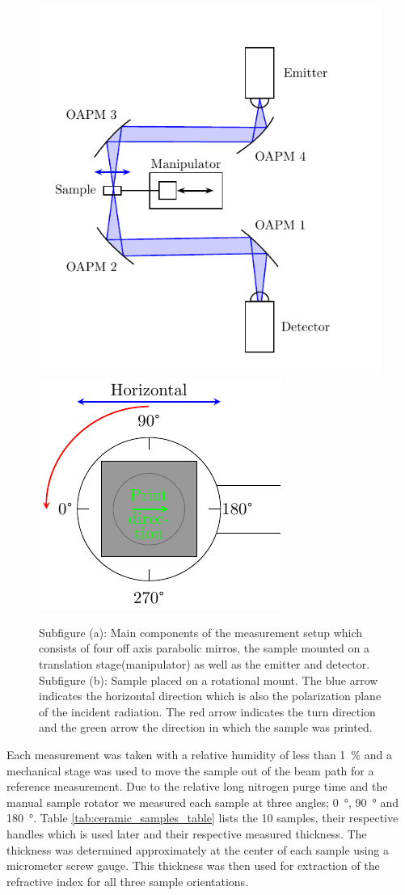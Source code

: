 \begin{figure}[H]
    \centering
    \subcaptionbox{\label{fig:setup_1}}
        {\hspace*{-2em}\includegraphics[width=0.45\linewidth]{images/7_appendix/Setup-THz-TDS-HHI.pdf}}
    \qquad
    \subcaptionbox{\label{fig:setup_2}}
        {\hspace*{-2em}\includegraphics[width=0.45\linewidth]{images/7_appendix/sample_mount.pdf}}
    
    \caption{Subfigure (a): Main components of the measurement setup which consists of four off axis parabolic mirros, the sample mounted on a translation stage(manipulator) as well as the emitter and detector. Subfigure (b): Sample placed on a rotational mount. The blue arrow indicates the horizontal direction which is also the polarization plane of the incident radiation. The red arrow indicates the turn direction and the green arrow the direction in which the sample was printed.}
    \label{fig:THz-TDS-HHI}
\end{figure}

Each measurement was taken with a relative humidity of less than \SI{1}{\percent} and a mechanical stage was used to move the sample out of the beam path for a reference measurement. Due to the relative long nitrogen purge time and the manual sample rotator we measured each sample at three angles; \SI{0}{\degree}, \SI{90}{\degree} and \SI{180}{\degree}.
Table \ref{tab:ceramic_samples_table} lists the 10 samples, their respective handles which is used later and their respective measured thickness. The thickness was determined approximately at the center of each sample using a micrometer screw gauge. This thickness was then used for extraction of the refractive index for all three sample orientations. 

